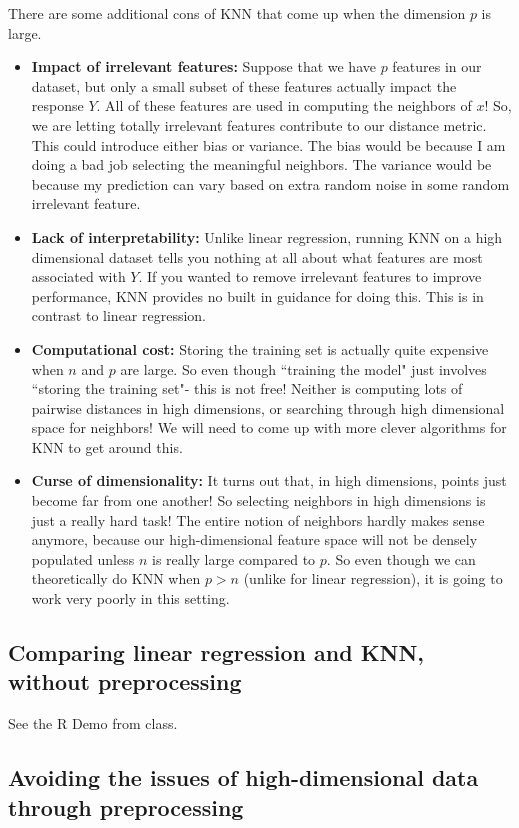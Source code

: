 There are some additional cons of KNN that come up when the dimension $p$ is large. 
\begin{itemize}
\item \textbf{Impact of irrelevant features:} Suppose that we have $p$ features in our dataset, but only a small subset of these features actually impact the response $Y$. All of these features are used in computing the neighbors of $x$! So, we are letting totally irrelevant features contribute to our distance metric. This could introduce either bias or variance. The bias would be because I am doing a bad job selecting the meaningful neighbors. The variance would be because my prediction can vary based on extra random noise in some random irrelevant feature. 
\item \textbf{Lack of interpretability:} Unlike linear regression, running KNN on a high dimensional dataset tells you nothing at all about what features are most associated with $Y$. If you wanted to remove irrelevant features to improve performance, KNN provides no built in guidance for doing this. This is in contrast to linear regression. 
\item \textbf{Computational cost:} Storing the training set is actually quite expensive when $n$ and $p$ are large. So even though ``training the model" just involves ``storing the training set"- this is not free! Neither is computing lots of pairwise distances in high dimensions, or searching through high dimensional space for neighbors! We will need to come up with more clever algorithms for KNN to get around this. 
\item \textbf{Curse of dimensionality:} It turns out that, in high dimensions, points just become far from one another! So selecting neighbors in high dimensions is just a really hard task! The entire notion of neighbors hardly makes sense anymore, because our high-dimensional feature space will not be densely populated unless $n$ is really large compared to $p$.  So even though we can theoretically do KNN when $p > n$ (unlike for linear regression), it is going to work very poorly in this setting. 
\end{itemize}


\subsection{Comparing linear regression and KNN, without preprocessing}

See the R Demo from class.

\subsection{Avoiding the issues of high-dimensional data through preprocessing}

